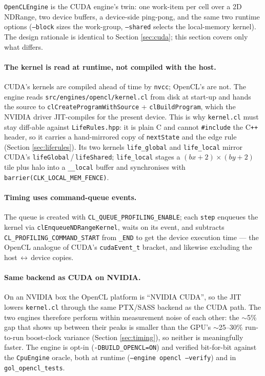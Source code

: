 \documentclass[
	english,
	letterpaper, oneside
]{article}
\begin{document}
\texttt{OpenCLEngine} is the CUDA engine's twin: one work-item per cell over a 2D
NDRange, two device buffers, a device-side ping-pong, and the same two runtime
options (\texttt{--block} sizes the work-group, \texttt{--shared} selects the
local-memory kernel). The design rationale is identical to Section
\ref{sec:cuda}; this section covers only what differs.

\paragraph{The kernel is read at runtime, not compiled with the host.} CUDA's
kernels are compiled ahead of time by \texttt{nvcc}; OpenCL's are not. The engine
reads \texttt{src/engines/opencl/kernel.cl} from disk at start-up and hands the
source to \texttt{clCreateProgramWithSource} + \texttt{clBuildProgram}, which the
NVIDIA driver JIT-compiles for the present device. This is why \texttt{kernel.cl}
must stay diff-able against \texttt{LifeRules.hpp}: it is plain C and cannot
\texttt{\#include} the C\texttt{++} header, so it carries a hand-mirrored copy of
\texttt{nextState} and the edge rule (Section \ref{sec:liferules}). Its two kernels
\texttt{life\_global} and \texttt{life\_local} mirror CUDA's
\texttt{lifeGlobal}\,/\,\texttt{lifeShared}; \texttt{life\_local} stages a
$(bx{+}2)\times(by{+}2)$ tile plus halo into a \texttt{\_\_local} buffer and
synchronises with \texttt{barrier(CLK\_LOCAL\_MEM\_FENCE)}.

\paragraph{Timing uses command-queue events.} The queue is created with
\texttt{CL\_QUEUE\_PROFILING\_ENABLE}; each \texttt{step} enqueues the kernel via
\texttt{clEnqueueNDRangeKernel}, waits on its event, and subtracts
\texttt{CL\_PROFILING\_COMMAND\_START} from \texttt{\_END} to get the device
execution time --- the OpenCL analogue of CUDA's \texttt{cudaEvent\_t} bracket, and
likewise excluding the host\,$\leftrightarrow$\,device copies.

\paragraph{Same backend as CUDA on NVIDIA.} On an NVIDIA box the OpenCL platform
is ``NVIDIA CUDA'', so the JIT lowers \texttt{kernel.cl} through the same PTX/SASS
backend as the CUDA path. The two engines therefore perform within measurement
noise of each other: the $\sim$5\% gap that shows up between their peaks is smaller
than the GPU's $\sim$25--30\% run-to-run boost-clock variance (Section
\ref{sec:timing}), so neither is meaningfully faster. The engine is opt-in
(\texttt{-DBUILD\_OPENCL=ON}) and verified bit-for-bit against the
\texttt{CpuEngine} oracle, both at runtime (\texttt{--engine opencl --verify}) and in
\texttt{gol\_opencl\_tests}.
\end{document}
